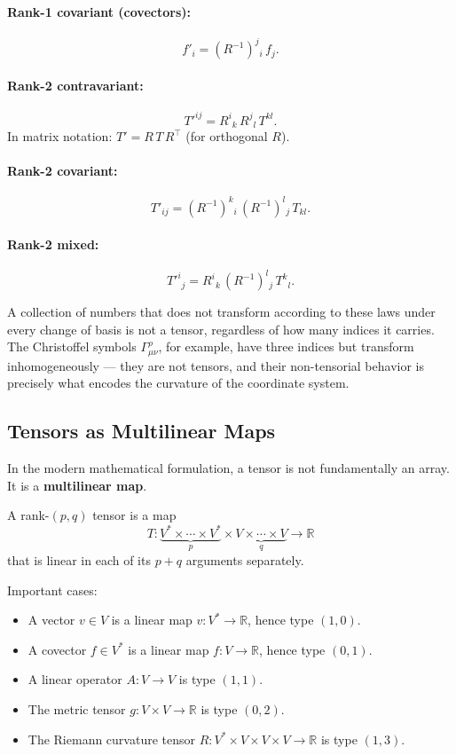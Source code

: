 \documentclass[12pt,a4paper]{article}
\begin{document}
\paragraph{Rank-1 covariant (covectors):}
\[
f'_i = (R^{-1})^j{}_i \, f_j.
\]

\paragraph{Rank-2 contravariant:}
\[
T'^{ij} = R^i{}_k \, R^j{}_l \, T^{kl}.
\]
In matrix notation: $T' = R \, T \, R^\top$ (for orthogonal $R$).

\paragraph{Rank-2 covariant:}
\[
T'_{ij} = (R^{-1})^k{}_i \, (R^{-1})^l{}_j \, T_{kl}.
\]

\paragraph{Rank-2 mixed:}
\[
T'^i{}_j = R^i{}_k \, (R^{-1})^l{}_j \, T^k{}_l.
\]

A collection of numbers that does not transform according to these laws under every change of basis is not a tensor, regardless of how many indices it carries. The Christoffel symbols $\Gamma^\rho_{\mu\nu}$, for example, have three indices but transform inhomogeneously --- they are not tensors, and their non-tensorial behavior is precisely what encodes the curvature of the coordinate system.

\subsection{Tensors as Multilinear Maps}

In the modern mathematical formulation, a tensor is not fundamentally an array. It is a \textbf{multilinear map}.

A rank-$(p, q)$ tensor is a map
\[
T : \underbrace{V^* \times \cdots \times V^*}_{p} \times \underbrace{V \times \cdots \times V}_{q} \to \mathbb{R}
\]
that is linear in each of its $p + q$ arguments separately.

Important cases:

\begin{itemize}
\item A vector $v \in V$ is a linear map $v : V^* \to \mathbb{R}$, hence type $(1, 0)$.
\item A covector $f \in V^*$ is a linear map $f : V \to \mathbb{R}$, hence type $(0, 1)$.
\item A linear operator $A : V \to V$ is type $(1, 1)$.
\item The metric tensor $g : V \times V \to \mathbb{R}$ is type $(0, 2)$.
\item The Riemann curvature tensor $R : V^* \times V \times V \times V \to \mathbb{R}$ is type $(1, 3)$.
\end{itemize}
\end{document}
